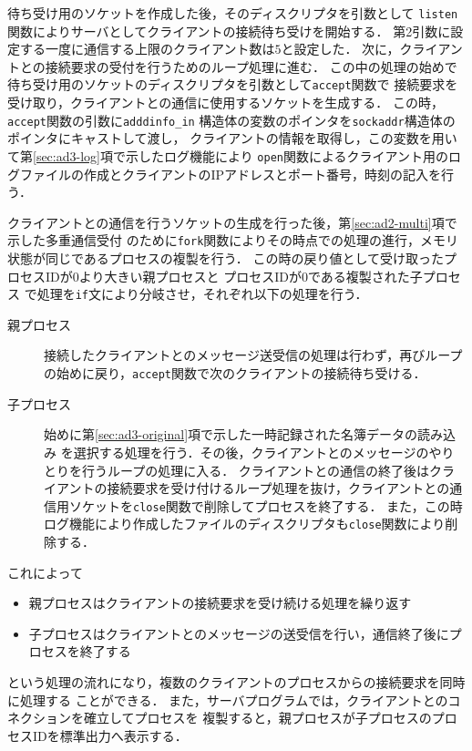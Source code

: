 待ち受け用のソケットを作成した後，そのディスクリプタを引数として
\verb|listen|関数によりサーバとしてクライアントの接続待ち受けを開始する．
第2引数に設定する一度に通信する上限のクライアント数は$5$と設定した．
次に，クライアントとの接続要求の受付を行うためのループ処理に進む．
この中の処理の始めで待ち受け用のソケットのディスクリプタを引数として\verb|accept|関数で
接続要求を受け取り，クライアントとの通信に使用するソケットを生成する．
この時，\verb|accept|関数の引数に\verb|adddinfo_in|
構造体の変数のポインタを\verb|sockaddr|構造体のポインタにキャストして渡し，
クライアントの情報を取得し，この変数を用いて第\ref{sec:ad3-log}項で示したログ機能により
\verb|open|関数によるクライアント用のログファイルの作成とクライアントのIPアドレスとポート番号，時刻の記入を行う．


クライアントとの通信を行うソケットの生成を行った後，第\ref{sec:ad2-multi}項で示した多重通信受付
のために\verb|fork|関数によりその時点での処理の進行，メモリ状態が同じであるプロセスの複製を行う．
この時の戻り値として受け取ったプロセスIDが0より大きい親プロセスと
プロセスIDが0である複製された子プロセス
で処理を\verb|if|文により分岐させ，それぞれ以下の処理を行う．
\begin{description}
  \item[親プロセス] 接続したクライアントとのメッセージ送受信の処理は行わず，再びループの始めに戻り，\verb|accept|関数で次のクライアントの接続待ち受ける．
  \item[子プロセス] 始めに第\ref{sec:ad3-original}項で示した一時記録された名簿データの読み込み
  を選択する処理を行う．その後，クライアントとのメッセージのやりとりを行うループの処理に入る．
  クライアントとの通信の終了後はクライアントの接続要求を受け付けるループ処理を抜け，クライアントとの通信用ソケットを\verb|close|関数で削除してプロセスを終了する．
  また，この時ログ機能により作成したファイルのディスクリプタも\verb|close|関数により削除する．
\end{description}
これによって
\begin{itemize}
  \item 親プロセスはクライアントの接続要求を受け続ける処理を繰り返す
  \item 子プロセスはクライアントとのメッセージの送受信を行い，通信終了後にプロセスを終了する
\end{itemize}
という処理の流れになり，複数のクライアントのプロセスからの接続要求を同時に処理する
ことができる．
また，サーバプログラムでは，クライアントとのコネクションを確立してプロセスを
複製すると，親プロセスが子プロセスのプロセスIDを標準出力へ表示する．

